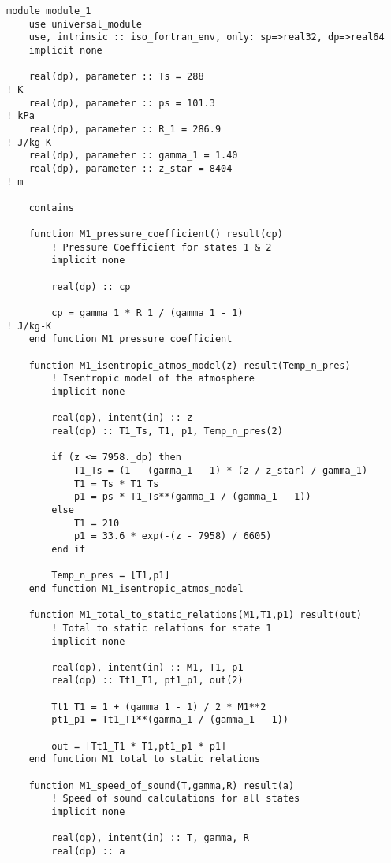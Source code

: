 \begin{verbatim}
module module_1
    use universal_module
    use, intrinsic :: iso_fortran_env, only: sp=>real32, dp=>real64
    implicit none

    real(dp), parameter :: Ts = 288                                     ! K
    real(dp), parameter :: ps = 101.3                                   ! kPa
    real(dp), parameter :: R_1 = 286.9                                  ! J/kg-K
    real(dp), parameter :: gamma_1 = 1.40
    real(dp), parameter :: z_star = 8404                                ! m

    contains

    function M1_pressure_coefficient() result(cp)
        ! Pressure Coefficient for states 1 & 2
        implicit none

        real(dp) :: cp

        cp = gamma_1 * R_1 / (gamma_1 - 1)                              ! J/kg-K
    end function M1_pressure_coefficient

    function M1_isentropic_atmos_model(z) result(Temp_n_pres)
        ! Isentropic model of the atmosphere
        implicit none

        real(dp), intent(in) :: z
        real(dp) :: T1_Ts, T1, p1, Temp_n_pres(2)

        if (z <= 7958._dp) then
            T1_Ts = (1 - (gamma_1 - 1) * (z / z_star) / gamma_1)
            T1 = Ts * T1_Ts
            p1 = ps * T1_Ts**(gamma_1 / (gamma_1 - 1))
        else
            T1 = 210
            p1 = 33.6 * exp(-(z - 7958) / 6605)
        end if

        Temp_n_pres = [T1,p1]
    end function M1_isentropic_atmos_model

    function M1_total_to_static_relations(M1,T1,p1) result(out)
        ! Total to static relations for state 1
        implicit none

        real(dp), intent(in) :: M1, T1, p1
        real(dp) :: Tt1_T1, pt1_p1, out(2)
        
        Tt1_T1 = 1 + (gamma_1 - 1) / 2 * M1**2
        pt1_p1 = Tt1_T1**(gamma_1 / (gamma_1 - 1))

        out = [Tt1_T1 * T1,pt1_p1 * p1]
    end function M1_total_to_static_relations

    function M1_speed_of_sound(T,gamma,R) result(a)
        ! Speed of sound calculations for all states
        implicit none

        real(dp), intent(in) :: T, gamma, R
        real(dp) :: a


\end{verbatim}
